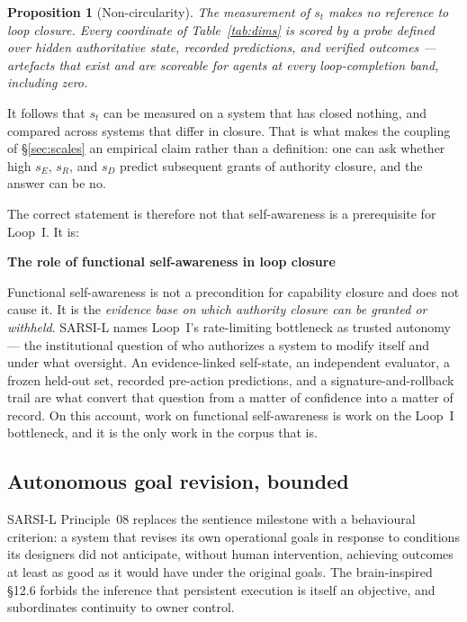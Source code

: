 \documentclass[11pt]{article}
\newenvironment{claimbox}[1]{%
  \begin{shaded}\noindent\textbf{#1}\par\smallskip}{%
  \end{shaded}}
\newtheorem{proposition}{Proposition}
\begin{document}
\begin{proposition}[Non-circularity]
The measurement of $s_t$ makes no reference to loop closure. Every coordinate of Table~\ref{tab:dims} is scored by a probe defined over hidden authoritative state, recorded predictions, and verified outcomes --- artefacts that exist and are scoreable for agents at every loop-completion band, including zero.
\end{proposition}

\noindent It follows that $s_t$ can be measured on a system that has closed nothing, and compared across systems that differ in closure. That is what makes the coupling of \S\ref{sec:scales} an empirical claim rather than a definition: one can ask whether high $s_E$, $s_R$, and $s_D$ predict subsequent grants of authority closure, and the answer can be no.

The correct statement is therefore not that self-awareness is a prerequisite for Loop~I. It is:

\begin{claimbox}{The role of functional self-awareness in loop closure}
Functional self-awareness is not a precondition for capability closure and does not cause it. It is the \emph{evidence base on which authority closure can be granted or withheld}. SARSI-L names Loop~I's rate-limiting bottleneck as trusted autonomy --- the institutional question of who authorizes a system to modify itself and under what oversight. An evidence-linked self-state, an independent evaluator, a frozen held-out set, recorded pre-action predictions, and a signature-and-rollback trail are what convert that question from a matter of confidence into a matter of record. On this account, work on functional self-awareness is work on the Loop~I bottleneck, and it is the only work in the corpus that is.
\end{claimbox}

\subsection{Autonomous goal revision, bounded}
SARSI-L Principle~08 replaces the sentience milestone with a behavioural criterion: a system that revises its own operational goals in response to conditions its designers did not anticipate, without human intervention, achieving outcomes at least as good as it would have under the original goals. The brain-inspired \S12.6 forbids the inference that persistent execution is itself an objective, and subordinates continuity to owner control.
\end{document}
